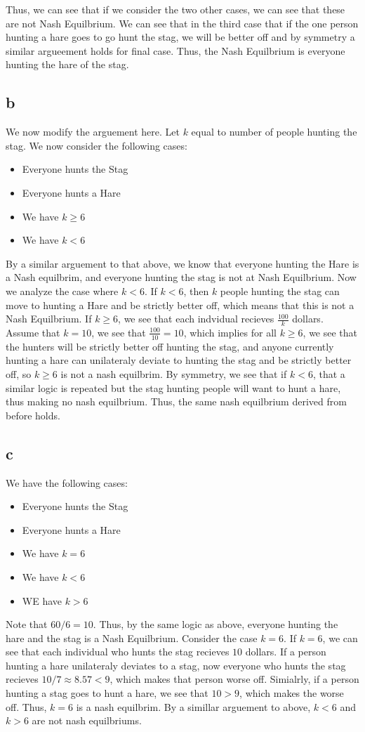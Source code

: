\documentclass[11pt]{article}
\begin{document}
Thus, we can see that if we consider the two other cases, we can see that these are not Nash Equilbrium. We can see that in the third case that if the one person hunting a hare goes to go hunt the stag, we will be better off and by symmetry a similar argueement holds for final case. Thus, the Nash Equilbrium is everyone hunting the hare of the stag.  
\subsection*{b}
We now modify the arguement here. Let $k$ equal to number of people hunting the stag. We now consider the following cases:
\begin{itemize}
    \item Everyone hunts the Stag 
    \item Everyone hunts a Hare 
    \item We have $k \geq 6$
    \item We have $k < 6$
\end{itemize}
By a similar arguement to that above, we know that everyone hunting the Hare is a Nash equilbrim, and everyone hunting the stag is not at Nash Equilbrium. Now we analyze the case where $k < 6$. If $k < 6$, then $k$ people hunting the stag can move to hunting a Hare and be strictly better off, which means that this is not a Nash Equilbrium. If $k \geq 6$, we see that each indvidual recieves $\frac{100}{k}$ dollars. Assume that $k = 10$, we see that $\frac{100}{10} = 10$, which implies for all $k \geq 6$, we see that the hunters will be strictly better off hunting the stag, and anyone currently hunting a hare can unilateraly deviate to hunting the stag and be strictly better off, so $k \geq 6$ is not a nash equilbrim. By symmetry, we see that if $k < 6$, that a similar logic is repeated but the stag hunting people will want to hunt a hare, thus making no nash equilbrium. Thus, the same nash equilbrium derived from before holds. 
\subsection*{c}
We have the following cases:
\begin{itemize}
    \item Everyone hunts the Stag
    \item Everyone hunts a Hare
    \item We have $k = 6$ 
    \item We have $k < 6$
    \item WE have $k > 6$
\end{itemize}
Note that $60 / 6 = 10$. Thus, by the same logic as above, everyone hunting the hare and the stag is a Nash Equilbrium. Consider the case $k = 6$. If $k = 6$, we can see that each individual who hunts the stag recieves $10$ dollars. If a person hunting a hare unilateraly deviates to a stag, now everyone who hunts the stag recieves $10 /7 \approx 8.57 < 9$, which makes that person worse off. Simialrly, if a person hunting a stag goes to hunt a hare, we see that $10 > 9$, which makes the worse off. Thus, $k = 6$ is a nash equilbrim. By a simillar arguement to above, $k < 6$ and $k > 6$ are not nash equilbriums. 
\end{document}

